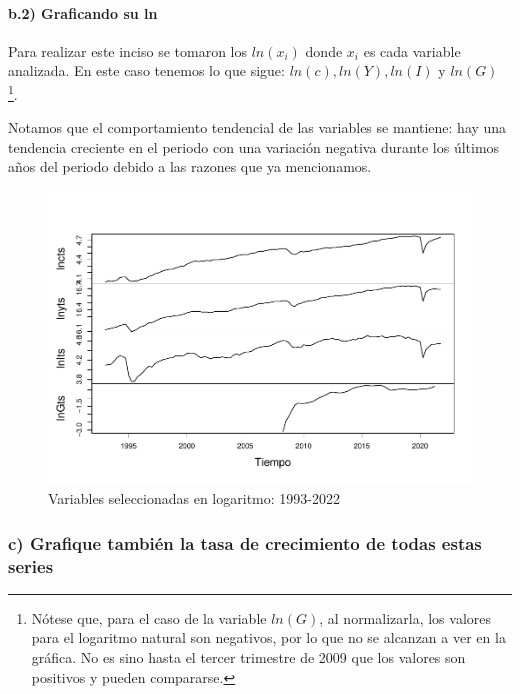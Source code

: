 \documentclass[
]{article}
\begin{document}
\hypertarget{b.2-graficando-su-ln}{%
\paragraph{b.2) Graficando su ln}\label{b.2-graficando-su-ln}}

Para realizar este inciso se tomaron los \(ln(x_i)\) donde \(x_i\) es
cada variable analizada. En este caso tenemos lo que sigue:
\(ln(c), ln(Y), ln(I)\) y \(ln(G)\) \footnote{Nótese que, para el caso
  de la variable \(ln(G)\), al normalizarla, los valores para el
  logaritmo natural son negativos, por lo que no se alcanzan a ver en la
  gráfica. No es sino hasta el tercer trimestre de 2009 que los valores
  son positivos y pueden compararse.}.

Notamos que el comportamiento tendencial de las variables se mantiene:
hay una tendencia creciente en el periodo con una variación negativa
durante los últimos años del periodo debido a las razones que ya
mencionamos.

\begin{figure}
\centering
\includegraphics{Ejercicio-3_files/figure-latex/unnamed-chunk-6-1.pdf}
\caption{Variables seleccionadas en logaritmo: 1993-2022}
\end{figure}

\hypertarget{c-grafique-tambiuxe9n-la-tasa-de-crecimiento-de-todas-estas-series}{%
\subsubsection{c) Grafique también la tasa de crecimiento de todas estas
series}\label{c-grafique-tambiuxe9n-la-tasa-de-crecimiento-de-todas-estas-series}}
\end{document}
